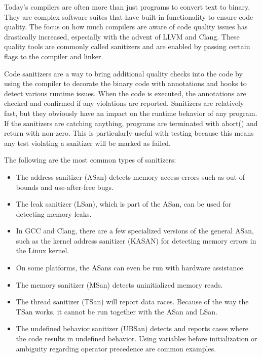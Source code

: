 Today's compilers are often more than just programs to convert text to binary. They are complex software suites that have built-in functionality to ensure code quality. The focus on how much compilers are aware of code quality issues has drastically increased, especially with the advent of LLVM and Clang. These quality tools are commonly called sanitizers and are enabled by passing certain flags to the compiler and linker.

Code sanitizers are a way to bring additional quality checks into the code by using the compiler to decorate the binary code with annotations and hooks to detect various runtime issues. When the code is executed, the annotations are checked and confirmed if any violations are reported. Sanitizers are relatively fast, but they obviously have an impact on the runtime behavior of any program. If the sanitizers are catching anything, programs are terminated with abort() and return with non-zero. This is particularly useful with testing because this means any test violating a sanitizer will be marked as failed.

The following are the most common types of sanitizers:

\begin{itemize}
\item 
The address sanitizer (ASan) detects memory access errors such as out-of-bounds and use-after-free bugs.

\item 
The leak sanitizer (LSan), which is part of the ASan, can be used for detecting memory leaks.

\item 
In GCC and Clang, there are a few specialized versions of the general ASan, such as the kernel address sanitizer (KASAN) for detecting memory errors in the Linux kernel.

\item 
On some platforms, the ASans can even be run with hardware assistance.

\item 
The memory sanitizer (MSan) detects uninitialized memory reads.

\item 
The thread sanitizer (TSan) will report data races. Because of the way the TSan works, it cannot be run together with the ASan and LSan.

\item 
The undefined behavior sanitizer (UBSan) detects and reports cases where the code results in undefined behavior. Using variables before initialization or ambiguity regarding operator precedence are common examples.
\end{itemize}

